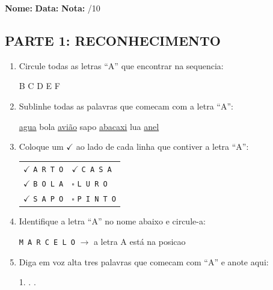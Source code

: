 \begin{exercicio}
\noindent\textbf{Nome:} \underline{\hspace{3.2cm}} \quad \textbf{Data:} \underline{\hspace{1.6cm}} \quad \textbf{Nota:} \underline{\hspace{0.9cm}}/10

\subsection*{PARTE 1: RECONHECIMENTO}

\begin{enumerate}
  \item Circule todas as letras ``A'' que encontrar na sequencia:
  \begin{center}
   \quad B \quad {} \quad C \quad {} \quad D \quad {} \quad E \quad {} \quad F
  \end{center}

  \item Sublinhe todas as palavras que comecam com a letra ``A'':
  \begin{center}
  \uline{agua} \quad bola \quad \uline{avi\~{a}o} \quad sapo \quad \uline{abacaxi} \quad lua \quad \uline{anel}
  \end{center}

  \item Coloque um $\checkmark$ ao lado de cada linha que contiver a letra ``A'':
  \begin{center}
  \begin{tabular}{ll}
  $\checkmark$ \texttt{A R T O} & $\checkmark$ \texttt{C A S A} \\
  $\checkmark$ \texttt{B O L A} & $\square$ \texttt{L U R O} \\
  $\checkmark$ \texttt{S A P O} & $\square$ \texttt{P I N T O}
  \end{tabular}
  \end{center}

  \item Identifique a letra ``A'' no nome abaixo e circule-a:
  \begin{center}
  \texttt{M A R C E L O} $\rightarrow$ a letra A est\'a na posicao \underline{\hspace{1cm}}
  \end{center}

  \item Diga em voz alta tres palavras que comecam com ``A'' e anote aqui:
  \begin{center}
  1. \underline{\hspace{4cm}} . \underline{\hspace{4cm}} . \underline{\hspace{4cm}}
  \end{center}
\end{enumerate}


\end{exercicio}
